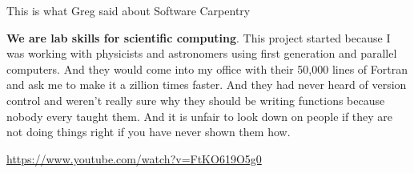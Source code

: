 \begin{frame}{This is what Greg said about Software Carpentry}
	\begin{alertblock}{}
		\textbf{We are lab skills for scientific computing}. This project started because I was working with physicists and astronomers using first generation and parallel computers. And they would come into my office with their 50,000 lines of Fortran and ask me to make it a zillion times faster. And they had never heard of version control and weren't really sure why they should be writing functions because nobody every taught them. And it is unfair to look down on people if they are not doing things right if you have never shown them how.
		\linebreak
		
		\tiny\url{https://www.youtube.com/watch?v=FtKO619O5g0}
	\end{alertblock}

\end{frame}